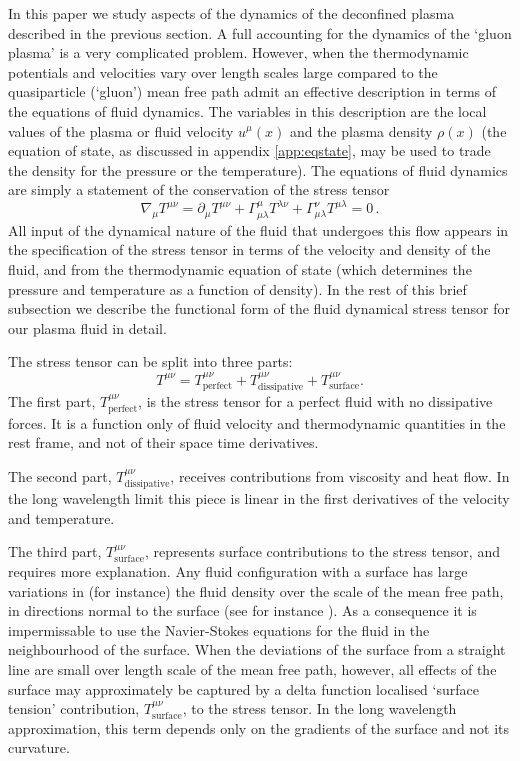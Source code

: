 \documentclass[12pt,a4paper]{article}
\newcommand{\p}{\partial}
\begin{document}
In this paper we study aspects of the dynamics of the deconfined
plasma described in the previous section. A full accounting for the
dynamics of the `gluon plasma' is a very complicated problem.
However, when the thermodynamic potentials and velocities vary over
length scales large compared to the quasiparticle (`gluon') mean
free path admit an effective description in terms of the equations
of fluid dynamics. The variables in this description are the local
values of the plasma or fluid velocity $u^\mu(x)$ and the plasma
density $\rho(x)$ (the equation of state, as discussed in appendix
\ref{app:eqstate}, may be used to trade the density for the pressure
or the temperature). The equations of fluid dynamics are simply a
statement of the conservation of the stress tensor
%
\begin{equation}\label{Epconsv:eq}
  \nabla_\mu T^{\mu\nu} = \p_\mu T^{\mu\nu}
                        + \Gamma^\mu_{\mu\lambda} T^{\lambda\nu}
                        + \Gamma^\nu_{\mu\lambda} T^{\mu\lambda}
                        = 0\,.
\end{equation}
%
All input of the dynamical nature of the fluid that undergoes this
flow appears in the specification of the stress tensor in terms of
the velocity and density of the fluid, and from the thermodynamic
equation of state (which determines the pressure and temperature as
a function of density). In the rest of this brief subsection we
describe the functional form of the fluid dynamical stress tensor
for our plasma fluid  in detail.

The stress tensor can be split into three parts:
%
\begin{equation*}
  T^{\mu\nu} = T^{\mu\nu}_\mathrm{perfect} +
          T^{\mu\nu}_\mathrm{dissipative} +
          T^{\mu\nu}_\mathrm{surface}.
\end{equation*}
%
The first part, $T^{\mu\nu}_\mathrm{perfect}$, is the stress tensor
for a perfect fluid with no dissipative forces. It is a function
only of fluid velocity and thermodynamic quantities in the rest
frame, and not of their space time derivatives.

The second part, $T^{\mu\nu}_\mathrm{dissipative}$, receives
contributions from viscosity and heat flow. In the long wavelength
limit this piece is linear in the first derivatives of the velocity
and temperature.

The third part, $T^{\mu\nu}_\mathrm{surface}$, represents surface
contributions to the stress tensor, and requires more explanation.
Any fluid configuration with a surface has large variations in (for
instance) the fluid density over the scale of the mean free path, in
directions normal to the surface (see for instance
\cite{Aharony:2005bm}). As a consequence it is impermissable to use
the Navier-Stokes equations for the fluid in the neighbourhood of
the surface. When the deviations of the surface from a straight line
are small over length scale of the mean free path, however, all
effects of the surface may approximately be captured by a delta
function localised `surface tension' contribution,
$T^{\mu\nu}_\mathrm{surface}$, to the stress tensor. In the long
wavelength approximation, this term depends only on the gradients of
the surface and not its curvature.
\end{document}
